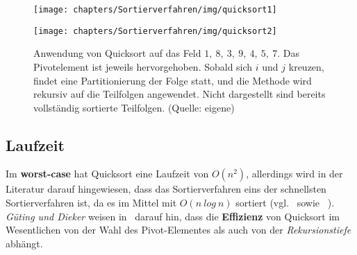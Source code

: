 \begin{figure}
    \begin{center}
        \texttt{[image: chapters/Sortierverfahren/img/quicksort1]}
    \end{center}
    \begin{center}
        \texttt{[image: chapters/Sortierverfahren/img/quicksort2]}
        \caption{Anwendung von Quicksort auf das Feld $1,\ 8,\ 3,\ 9,\ 4,\ 5,\ 7$. Das Pivotelement ist jeweils hervorgehoben. Sobald sich $i$ und $j$ kreuzen, findet eine Partitionierung der Folge statt, und die Methode wird rekursiv auf die Teilfolgen angewendet. Nicht dargestellt sind bereits vollständig sortierte Teilfolgen. (Quelle: eigene)}
        \label{fig:quicksort}
    \end{center}
\end{figure}


\subsection{Laufzeit}
Im \textbf{worst-case} hat Quicksort eine Laufzeit von $O(n^2)$, allerdings wird in der Literatur darauf hingewiesen, dass das Sortierverfahren eins der schnellsten Sortierverfahren ist, da es im Mittel mit $O(n\ log\ n)$ sortiert (vgl.~\cite[92]{OW17b} sowie ~\cite[173]{GD18e}).\\
\textit{Güting und Dieker} weisen in~\cite[182 f.]{GD18e} darauf hin, dass die \textbf{Effizienz} von Quicksort im Wesentlichen von der Wahl des Pivot-Elementes als auch von der \textit{Rekursionstiefe} abhängt.